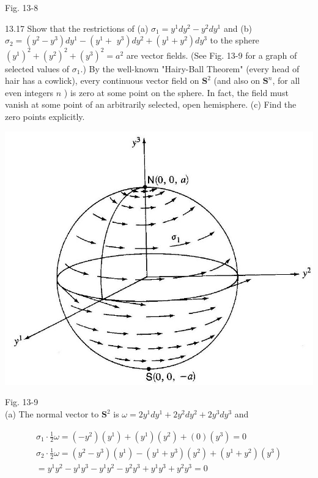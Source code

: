 \documentclass[10pt]{article}
\begin{document}
Fig. 13-8

13.17 Show that the restrictions of (a) $\sigma_{1}=y^{1} d y^{2}-y^{2} d y^{1}$ and (b) $\sigma_{2}=\left(y^{2}-y^{3}\right) d y^{1}-\left(y^{1}+\right.$ $\left.y^{3}\right) d y^{2}+\left(y^{1}+y^{2}\right) d y^{3}$ to the sphere $\left(y^{1}\right)^{2}+\left(y^{2}\right)^{2}+\left(y^{3}\right)^{2}=a^{2}$ are vector fields. (See Fig. 13-9 for a graph of selected values of $\sigma_{1}$.) By the well-known "Hairy-Ball Theorem" (every head of hair has a cowlick), every continuous vector field on $\mathbf{S}^{2}$ (and also on $\mathbf{S}^{n}$, for all even integers $n$ ) is zero at some point on the sphere. In fact, the field must vanish at some point of an arbitrarily selected, open hemisphere. (c) Find the zero points explicitly.

\begin{center}
\includegraphics[max width=\textwidth]{2024_04_03_41f90be4f896e21f0dc9g-217(1)}
\end{center}

Fig. 13-9\\
(a) The normal vector to $\mathbf{S}^{2}$ is $\omega=2 y^{1} d y^{1}+2 y^{2} d y^{2}+2 y^{3} d y^{3}$ and


\begin{gather*}
\sigma_{1} \cdot \frac{1}{2} \omega=\left(-y^{2}\right)\left(y^{1}\right)+\left(y^{1}\right)\left(y^{2}\right)+(0)\left(y^{3}\right)=0 \\
\sigma_{2} \cdot \frac{1}{2} \omega=\left(y^{2}-y^{3}\right)\left(y^{1}\right)-\left(y^{1}+y^{3}\right)\left(y^{2}\right)+\left(y^{1}+y^{2}\right)\left(y^{3}\right)  \tag{b}\\
=y^{1} y^{2}-y^{1} y^{3}-y^{1} y^{2}-y^{2} y^{3}+y^{1} y^{3}+y^{2} y^{3}=0
\end{gather*}
\end{document}
